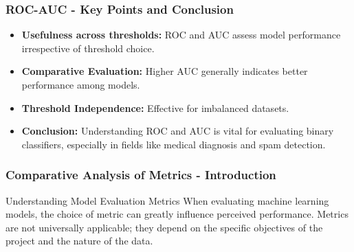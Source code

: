 \documentclass[aspectratio=169]{beamer}
\begin{document}
\begin{frame}[fragile]
    \frametitle{ROC-AUC - Key Points and Conclusion}
    \begin{itemize}
        \item \textbf{Usefulness across thresholds:} ROC and AUC assess model performance irrespective of threshold choice.  
        \item \textbf{Comparative Evaluation:} Higher AUC generally indicates better performance among models.
        \item \textbf{Threshold Independence:} Effective for imbalanced datasets.
        \item \textbf{Conclusion:} Understanding ROC and AUC is vital for evaluating binary classifiers, especially in fields like medical diagnosis and spam detection.
    \end{itemize}
\end{frame}

\begin{frame}[fragile]
    \frametitle{Comparative Analysis of Metrics - Introduction}
    \begin{block}{Understanding Model Evaluation Metrics}
        When evaluating machine learning models, the choice of metric can greatly influence perceived performance. 
        Metrics are not universally applicable; they depend on the specific objectives of the project and the nature of the data.
    \end{block}
\end{frame}
\end{document}
